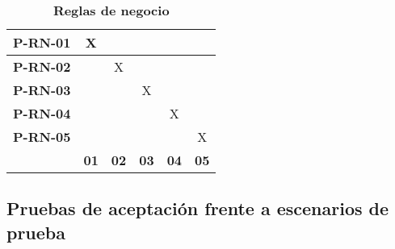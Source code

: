 \begin{table}[H]
	\centering
	\caption{\textbf{Reglas de negocio}}
	\label{Reglas de negocio}
	\begin{tabular}{|c|c|c|c|c|c|}
		\hline
		\textbf{P-RN-01} & X           &             &             &             &             \\ \hline
		\textbf{P-RN-02} &             &   X         &             &             &             \\ \hline
		\textbf{P-RN-03} &             &             &     X       &             &             \\ \hline
		\textbf{P-RN-04} &             &             &             & X           &             \\ \hline
		\textbf{P-RN-05} &             &             &             &             & X           \\ \hline
		\textbf{}      & \textbf{01} & \textbf{02} & \textbf{03} & \textbf{04} & \textbf{05} \\ \hline
	\end{tabular}
\end{table}

\subsection{Pruebas de aceptación frente a escenarios de prueba}

